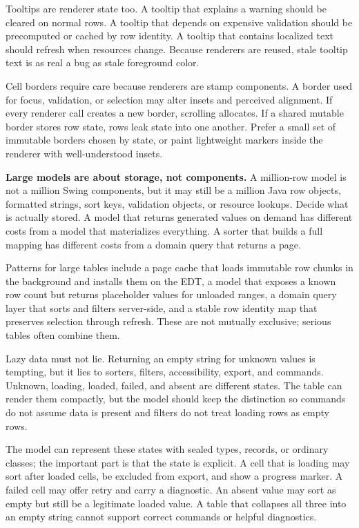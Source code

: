 Tooltips are renderer state too. A tooltip that explains a warning should be cleared on normal rows. A tooltip that depends on expensive validation should be precomputed or cached by row identity. A tooltip that contains localized text should refresh when resources change. Because renderers are reused, stale tooltip text is as real a bug as stale foreground color.

Cell borders require care because renderers are stamp components. A border used for focus, validation, or selection may alter insets and perceived alignment. If every renderer call creates a new border, scrolling allocates. If a shared mutable border stores row state, rows leak state into one another. Prefer a small set of immutable borders chosen by state, or paint lightweight markers inside the renderer with well-understood insets.

\textbf{Large models are about storage, not components.} A million-row model is not a million Swing components, but it may still be a million Java row objects, formatted strings, sort keys, validation objects, or resource lookups. Decide what is actually stored. A model that returns generated values on demand has different costs from a model that materializes everything. A sorter that builds a full mapping has different costs from a domain query that returns a page.

Patterns for large tables include a page cache that loads immutable row chunks in the background and installs them on the EDT, a model that exposes a known row count but returns placeholder values for unloaded ranges, a domain query layer that sorts and filters server-side, and a stable row identity map that preserves selection through refresh. These are not mutually exclusive; serious tables often combine them.

Lazy data must not lie. Returning an empty string for unknown values is tempting, but it lies to sorters, filters, accessibility, export, and commands. Unknown, loading, loaded, failed, and absent are different states. The table can render them compactly, but the model should keep the distinction so commands do not assume data is present and filters do not treat loading rows as empty rows.

The model can represent these states with sealed types, records, or ordinary classes; the important part is that the state is explicit. A cell that is loading may sort after loaded cells, be excluded from export, and show a progress marker. A failed cell may offer retry and carry a diagnostic. An absent value may sort as empty but still be a legitimate loaded value. A table that collapses all three into an empty string cannot support correct commands or helpful diagnostics.

